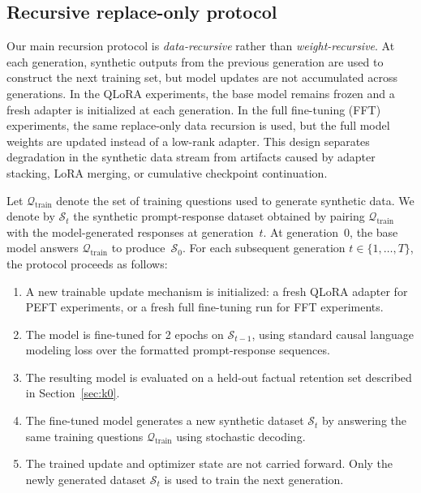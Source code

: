 \documentclass[a4paper,fleqn]{cas-dc}
\begin{document}
\subsection{Recursive replace-only protocol}\label{sec:protocol}

Our main recursion protocol is \textit{data-recursive} rather than
\textit{weight-recursive}. At each generation, synthetic outputs from the
previous generation are used to construct the next training set, but model
updates are not accumulated across generations. In the QLoRA experiments, the base model remains
frozen and a fresh adapter is initialized at each generation. In the full
fine-tuning (FFT) experiments, the same replace-only data recursion is used, but
the full model weights are updated instead of a low-rank adapter. This design
separates degradation in the synthetic data stream from artifacts caused by
adapter stacking, LoRA merging, or cumulative checkpoint continuation.

Let $\mathcal{Q}_{\mathrm{train}}$ denote the set of training questions used to
generate synthetic data. We denote by $\mathcal{S}_t$ the synthetic
prompt-response dataset obtained by pairing
$\mathcal{Q}_{\mathrm{train}}$ with the model-generated responses at
generation~$t$. At generation~0, the base model answers
$\mathcal{Q}_{\mathrm{train}}$ to produce~$\mathcal{S}_0$. For each subsequent
generation $t \in \{1,\ldots,T\}$, the protocol proceeds as follows:

\begin{enumerate}
    \item A new trainable update mechanism is initialized: a fresh QLoRA adapter
    for PEFT experiments, or a fresh full fine-tuning run for FFT experiments.
    \item The model is fine-tuned for 2 epochs on $\mathcal{S}_{t-1}$, using
    standard causal language modeling loss over the formatted prompt-response
    sequences.
    \item The resulting model is evaluated on a held-out factual retention set
    described in Section~\ref{sec:k0}.
    \item The fine-tuned model generates a new synthetic dataset
    $\mathcal{S}_t$ by answering the same training questions
    $\mathcal{Q}_{\mathrm{train}}$ using stochastic decoding.
    \item The trained update and optimizer state are not carried forward. Only
    the newly generated dataset $\mathcal{S}_t$ is used to train the next
    generation.
\end{enumerate}
\end{document}
